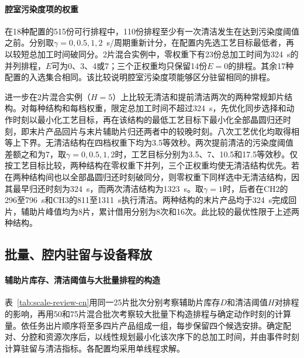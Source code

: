 \documentclass[final,5p,times,twocolumn]{elsarticle}
\begin{document}
\paragraph{腔室污染度项的权重}
在18种配置的515份可行排程中，110份排程至少有一次清洁发生在达到污染度阈值之前。分别取$\gamma=0,0.5,1,2$~s/周期重新计分，在配置内先选工艺目标最低者，再以较短总加工时间破同分。2片混合实例中，零权重下有23份总加工时间为324~s的并列排程，$E$可为0、3、4或7；三个正权重均只保留14份$E=0$的排程。其余17种配置的入选集合相同。该比较说明腔室污染度项能够区分驻留相同的排程。

进一步在2片混合实例（$H=5$）上比较无清洁和提前清洁两次的两种常规卸片结构。对每种结构和每档权重，限定总加工时间不超过324~s，先优化同步选择和动作时刻以最小化工艺目标，再在该结构的最低工艺目标下最小化全部晶圆归还时刻，即末片产品回片与末片辅助片归还两者中的较晚时刻。八次工艺优化均取得相等上下界。无清洁结构在四档权重下均为3.5等效秒。两次提前清洁的污染度阈值差额之和为7，取$\gamma=0,0.5,1,2$时，工艺目标分别为3.5、7、10.5和17.5等效秒。仅按工艺目标比较，两种结构在零权重下并列，三个正权重均使无清洁结构优先。若在两种结构间也以全部晶圆归还时刻破同分，则零权重下同样选中无清洁结构，因其最早归还时刻为324~s，而两次清洁结构为1323~s。取$\gamma=1$时，后者在CH2的296至796~s和CH3的811至1311~s执行清洁。两种结构的末片产品均于324~s完成回片，辅助片峰值均为8片，累计借用分别为8次和16次。此比较的最优性限于上述两种结构。

\FloatBarrier

\subsection{批量、腔内驻留与设备释放}
\label{sec:coverage-scale-cn}

\paragraph{辅助片库存、清洁阈值与大批量排程的构造}
表~\ref{tab:scale-review-cn}用同一25片批次分别考察辅助片库存$D$和清洁阈值$H$对排程的影响，再用50和75片混合批次考察较大批量下构造排程与确定动作时刻的计算量。依任务出片顺序将至多四片产品组成一组，每步保留四个候选安排。确定配对、分腔和资源次序后，以线性规划最小化该次序下的总加工时间，并由事件时刻计算驻留与清洁指标。各配置均采用单线程求解。
\end{document}
